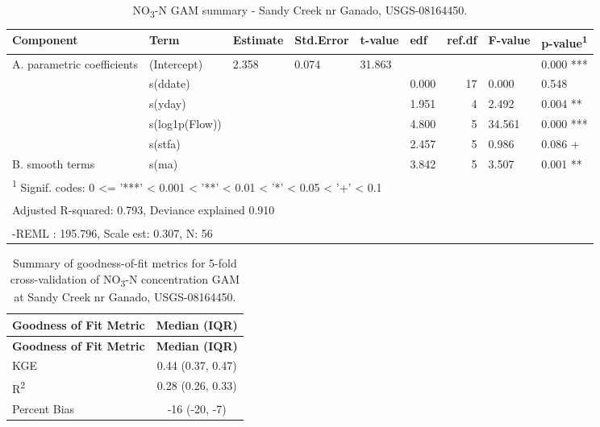 \documentclass[
]{article}
\newenvironment{widestuff}{\begin{table}[h]\begin{adjustwidth}{-4.5cm}{-4.5cm}\centering}{\end{adjustwidth}\end{table}}
\begin{document}
\begin{widestuff}

\caption{NO\textsubscript{3}-N GAM summary - Sandy Creek nr Ganado, USGS-08164450.}
\centering
\begin{tabular}[t]{llllllrll}
\toprule
Component & Term & Estimate & Std.Error & t-value & edf & ref.df & F-value & p-value\textsuperscript{1}\\
\midrule
A. parametric coefficients & (Intercept) & 2.358 & 0.074 & 31.863 &  &  &  & 0.000 ***\\
\cmidrule{1-9}
 & s(ddate) &  &  &  & 0.000 & 17 & 0.000 & 0.548\\

 & s(yday) &  &  &  & 1.951 & 4 & 2.492 & 0.004 **\\

 & s(log1p(Flow)) &  &  &  & 4.800 & 5 & 34.561 & 0.000 ***\\

 & s(stfa) &  &  &  & 2.457 & 5 & 0.986 & 0.086 +\\

\multirow[t]{-5}{*}{\raggedright\arraybackslash B. smooth terms} & s(ma) &  &  &  & 3.842 & 5 & 3.507 & 0.001 **\\
\bottomrule
\multicolumn{9}{l}{\textsuperscript{1} Signif. codes: 0 <= '***' < 0.001 < '**' < 0.01 < '*' < 0.05 < '+' < 0.1}\\
\multicolumn{9}{l}{\textsuperscript{} Adjusted R-squared: 0.793, Deviance explained 0.910}\\
\multicolumn{9}{l}{\textsuperscript{} -REML : 195.796, Scale est: 0.307, N: 56}\\
\end{tabular}
\end{widestuff}

\hypertarget{tbl-NO308164450-CV}{}
\begin{longtable}[]{@{}lc@{}}
\caption{\label{tbl-NO308164450-CV}Summary of goodness-of-fit metrics
for 5-fold cross-validation of NO\textsubscript{3}-N concentration GAM
at Sandy Creek nr Ganado, USGS-08164450.}\tabularnewline
\toprule()
\textbf{Goodness of Fit Metric} & \textbf{Median (IQR)} \\
\midrule()
\endfirsthead
\toprule()
\textbf{Goodness of Fit Metric} & \textbf{Median (IQR)} \\
\midrule()
\endhead
KGE & 0.44 (0.37, 0.47) \\
R\textsuperscript{2} & 0.28 (0.26, 0.33) \\
Percent Bias & -16 (-20, -7) \\
\bottomrule()
\end{longtable}
\end{document}
